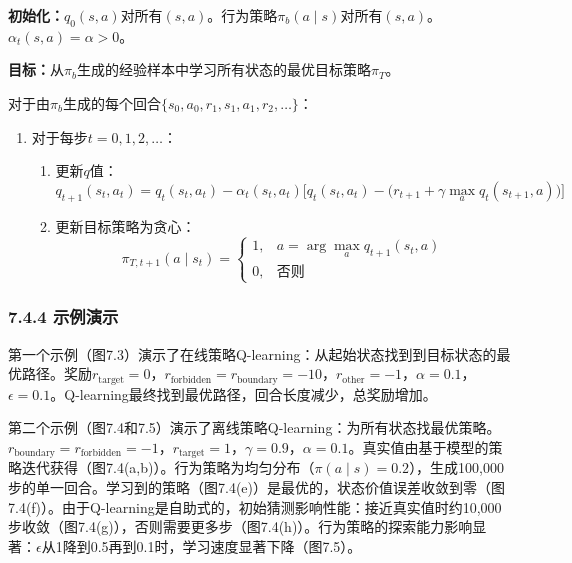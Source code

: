 \documentclass[UTF8]{article}
\begin{document}
\begin{tcolorbox}[
    colback=gray!5!white,
    colframe=gray!50!black,
    title=\textbf{算法7.3：通过Q-learning学习最优策略（离线策略版本）},
    fonttitle=\bfseries,
    arc=2pt, boxrule=0.8pt,
    left=3mm, right=3mm, top=2mm, bottom=2mm
]
\label{alg:qlearning_off}
\textbf{初始化：}$q_0(s, a)$对所有$(s, a)$。行为策略$\pi_b(a \mid s)$对所有$(s, a)$。$\alpha_t(s, a) = \alpha > 0$。

\textbf{目标：}从$\pi_b$生成的经验样本中学习所有状态的最优目标策略$\pi_T$。

对于由$\pi_b$生成的每个回合$\{s_0, a_0, r_1, s_1, a_1, r_2, \dots\}$：
\begin{enumerate}
    \item 对于每步$t = 0, 1, 2, \dots$：
    \begin{enumerate}
        \item 更新$q$值：
        \[
        q_{t+1}(s_t, a_t) = q_t(s_t, a_t) - \alpha_t(s_t, a_t)\Big[q_t(s_t, a_t) - \big(r_{t+1} + \gamma \max_a q_t(s_{t+1}, a)\big)\Big]
        \]
        \item 更新目标策略为贪心：
        \[
        \pi_{T, t+1}(a \mid s_t) =
        \begin{cases}
        1, & a = \arg\max_a q_{t+1}(s_t, a) \\
        0, & \text{否则}
        \end{cases}
        \]
    \end{enumerate}
\end{enumerate}
\end{tcolorbox}

\subsubsection*{7.4.4 示例演示}

第一个示例（图7.3）演示了在线策略Q-learning：从起始状态找到到目标状态的最优路径。奖励$r_{\text{target}} = 0$，$r_{\text{forbidden}} = r_{\text{boundary}} = -10$，$r_{\text{other}} = -1$，$\alpha = 0.1$，$\epsilon = 0.1$。Q-learning最终找到最优路径，回合长度减少，总奖励增加。

第二个示例（图7.4和7.5）演示了离线策略Q-learning：为所有状态找最优策略。$r_{\text{boundary}} = r_{\text{forbidden}} = -1$，$r_{\text{target}} = 1$，$\gamma = 0.9$，$\alpha = 0.1$。真实值由基于模型的策略迭代获得（图7.4(a,b)）。行为策略为均匀分布（$\pi(a \mid s) = 0.2$），生成100,000步的单一回合。学习到的策略（图7.4(e)）是最优的，状态价值误差收敛到零（图7.4(f)）。由于Q-learning是自助式的，初始猜测影响性能：接近真实值时约10,000步收敛（图7.4(g)），否则需要更多步（图7.4(h)）。行为策略的探索能力影响显著：$\epsilon$从1降到0.5再到0.1时，学习速度显著下降（图7.5）。
\end{document}
